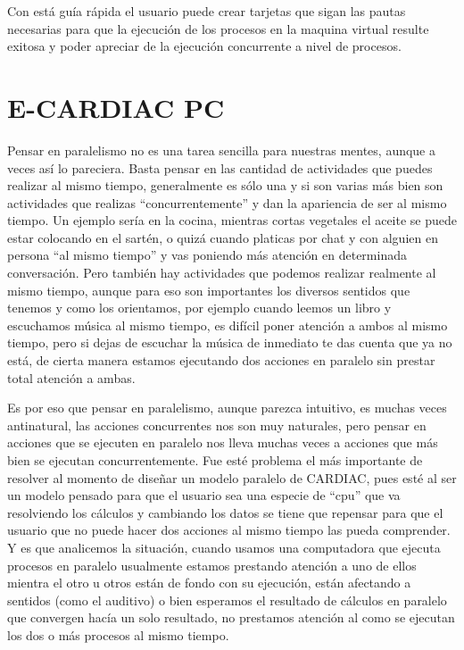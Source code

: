 \documentclass[letterpaper,12pt,oneside]{book}
\begin{document}
\begin{enumerate}
			\end{enumerate}
			
			
			Con está guía rápida el usuario puede crear tarjetas que sigan las pautas necesarias para que la ejecución de los procesos en
			la maquina virtual resulte exitosa y poder apreciar de la ejecución concurrente a nivel de procesos.
	
	\clearpage
	 \section{E-CARDIAC PC}
	 
	 Pensar en paralelismo no es una tarea sencilla para nuestras mentes, aunque a veces así lo pareciera. Basta pensar en las cantidad de actividades
	 que puedes realizar al mismo tiempo, generalmente es sólo una y si son varias más bien son actividades que realizas ``concurrentemente'' y
	 dan la apariencia de ser al mismo tiempo. Un ejemplo sería en la cocina, mientras cortas vegetales el aceite se puede estar colocando en el sartén,
	 o quizá cuando platicas por chat y con alguien en persona ``al mismo tiempo'' y vas poniendo más atención en determinada conversación. Pero también
	 hay actividades que podemos realizar realmente al mismo tiempo, aunque para eso son importantes los diversos sentidos que tenemos y como los orientamos, por
	 ejemplo cuando leemos un libro y escuchamos música al mismo tiempo, es difícil poner atención a ambos al mismo tiempo, pero si dejas de escuchar la música
	 de inmediato te das cuenta que ya no está, de cierta manera estamos ejecutando dos acciones en paralelo sin prestar total atención a ambas.
	 
	 Es por eso que pensar en paralelismo, aunque parezca intuitivo, es muchas veces antinatural, las acciones concurrentes nos son muy naturales,
	 pero pensar en acciones que se ejecuten en paralelo nos lleva muchas veces a acciones que más bien se ejecutan concurrentemente. Fue esté problema
	 el más importante de resolver al momento de diseñar un modelo paralelo de CARDIAC, pues esté al ser un modelo pensado para que el usuario sea
	 una especie de ``cpu'' que va resolviendo los cálculos y cambiando los datos se tiene que repensar para que el usuario que no puede hacer dos acciones al
	 mismo tiempo las pueda comprender. Y es que analicemos la situación, cuando usamos una computadora que ejecuta procesos en paralelo usualmente estamos prestando
	 atención a uno de ellos mientra el otro u otros están de fondo con su ejecución, están afectando a sentidos (como el auditivo) o bien esperamos el resultado
	 de cálculos en paralelo que convergen hacía un solo resultado, no prestamos atención al como se ejecutan los dos o más procesos al mismo tiempo.
	 
\end{document}
